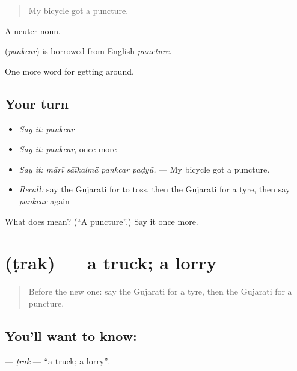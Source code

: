 \begin{quote}
My bicycle got a puncture.
\end{quote}

A neuter noun.

\begin{cousinweb}
\textbf{} (\emph{pankcar}) is borrowed from English \emph{puncture}.
\end{cousinweb}

\begin{grammarlens}[title={What you've built}]
One more word for getting around.
\end{grammarlens}

\subsection*{Your turn}
\begin{itemize}
\raggedright
  \item \emph{Say it:} \emph{pankcar}
  \item \emph{Say it:} \emph{pankcar}, once more
  \item \emph{Say it:} \emph{mārī sāīkalmā̃ pankcar paḍyũ.} — My bicycle got a puncture.
  \item \emph{Recall:} say the Gujarati for to toss, then the Gujarati for a tyre, then say \emph{pankcar} again
\end{itemize}

\begin{tcolorbox}[breakable,colback=teal!4,colframe=teal!35!black,title={Before you move on}]
What does  mean? (\textquotedblleft{}A puncture\textquotedblright{}.) Say it once more.
\end{tcolorbox}
\section[\texorpdfstring{\gu{ટ્રક} (ṭrak)}{ટ્રક (ṭrak)}]{ (ṭrak) — a truck; a lorry}

\label{lesson:GU-C401-trak}



\begin{quote}
Before the new one: say the Gujarati for a tyre, then the Gujarati for a puncture.
\end{quote}

\subsection*{You'll want to know: }
\textbf{} — \emph{ṭrak} — \textquotedblleft{}a truck; a lorry\textquotedblright{}.

